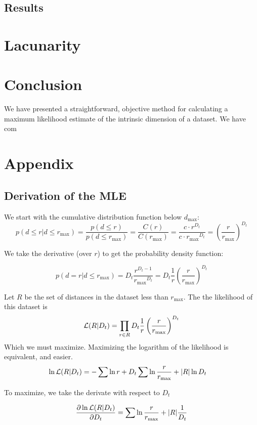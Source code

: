 \documentclass[11pt]{article}
\begin{document}
\subsection{Results}

\section{Lacunarity}
\label{lacunarity}


\section{Conclusion}

We have presented a straightforward, objective method for calculating a maximum likelihood estimate of the intrinsic dimension of a dataset. We have com 

\section{Appendix}

\subsection{Derivation of the MLE}
\label{mle-derivation}

We start with the cumulative distribution function below $d_{\max}$:
\[
p(d \leq r | d \leq r_{\max}) = \frac{p(d \leq r)}{p(d \leq r_{\max})} = \frac{C(r)}{C(r_{\max})} = \frac{c \cdot r^{D_t}}{c \cdot {r_{\max}} ^ {D_t}} = \left ( \frac{r}{r_{\max}} \right )^{D_t}
\]

We take the derivative (over $r$) to get the probability density function:

\[
p(d = r | d \leq r_{\max}) = D_t \frac{r^{D_t-1}}{{r_{\max}}^{D_t}} = D_t \frac{1}{r} \left (\frac{r}{r_{\max}} \right ) ^ {D_t} 
\]

Let $R$ be the set of distances in the dataset less than $r_{\max}$. The the likelihood of this dataset is
\[
{\cal L}(R|D_t) = \prod_{r \in R} D_t \frac{1}{r} \left (\frac{r}{r_{\max}} \right ) ^ {D_t} 
\] 
Which we must maximize. Maximizing the logarithm of the likelihood is equivalent, and easier.
\begin{align*}
\ln {\cal L}(R|D_t) &= -\sum \ln r + D_t \sum \ln \frac{r}{r_{\max}} + |R| \ln D_t
\end{align*}

To maximize, we take the derivate with respect to $D_t$

\begin{align*}
\frac{\partial \ln{\cal L}(R|D_t)}{\partial D_t} = \sum{\ln \frac{r}{r_{\max}}} + |R|\frac{1}{D_t}
\end{align*}
\end{document}
